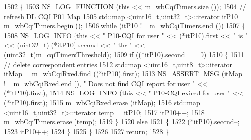 \begin{DoxyCode}
1502 \{
1503   \hyperlink{log-macros-disabled_8h_a90b90d5bad1f39cb1b64923ea94c0761}{NS\_LOG\_FUNCTION} (\textcolor{keyword}{this} << \hyperlink{classns3_1_1MmWaveFlexTtiPfMacScheduler_a3a90d6728425934c4358680b51666147}{m\_wbCqiTimers}.size ());
1504   \textcolor{comment}{// refresh DL CQI P01 Map}
1505   std::map <uint16\_t,uint32\_t>::iterator itP10 = \hyperlink{classns3_1_1MmWaveFlexTtiPfMacScheduler_a3a90d6728425934c4358680b51666147}{m\_wbCqiTimers}.begin ();
1506   \textcolor{keywordflow}{while} (itP10 != \hyperlink{classns3_1_1MmWaveFlexTtiPfMacScheduler_a3a90d6728425934c4358680b51666147}{m\_wbCqiTimers}.end ())
1507     \{
1508       \hyperlink{group__logging_gafbd73ee2cf9f26b319f49086d8e860fb}{NS\_LOG\_INFO} (\textcolor{keyword}{this} << \textcolor{stringliteral}{" P10-CQI for user "} << (*itP10).first << \textcolor{stringliteral}{" is "} << (uint32\_t)
      (*itP10).second << \textcolor{stringliteral}{" thr "} << (uint32\_t)\hyperlink{classns3_1_1MmWaveFlexTtiPfMacScheduler_ad61563379565ec249cdf6b4092fef22e}{m\_cqiTimersThreshold});
1509       \textcolor{keywordflow}{if} ((*itP10).second == 0)
1510         \{
1511           \textcolor{comment}{// delete correspondent entries}
1512           std::map <uint16\_t,uint8\_t>::iterator itMap = \hyperlink{classns3_1_1MmWaveFlexTtiPfMacScheduler_a2b746dc09bafd9ebdc2912b26c74beb9}{m\_wbCqiRxed}.find ((*itP10).first);
1513           \hyperlink{assert_8h_aff5ece9066c74e681e74999856f08539}{NS\_ASSERT\_MSG} (itMap != \hyperlink{classns3_1_1MmWaveFlexTtiPfMacScheduler_a2b746dc09bafd9ebdc2912b26c74beb9}{m\_wbCqiRxed}.end (), \textcolor{stringliteral}{" Does not find CQI report
       for user "} << (*itP10).first);
1514           \hyperlink{group__logging_gafbd73ee2cf9f26b319f49086d8e860fb}{NS\_LOG\_INFO} (\textcolor{keyword}{this} << \textcolor{stringliteral}{" P10-CQI exired for user "} << (*itP10).first);
1515           \hyperlink{classns3_1_1MmWaveFlexTtiPfMacScheduler_a2b746dc09bafd9ebdc2912b26c74beb9}{m\_wbCqiRxed}.erase (itMap);
1516           std::map <uint16\_t,uint32\_t>::iterator temp = itP10;
1517           itP10++;
1518           \hyperlink{classns3_1_1MmWaveFlexTtiPfMacScheduler_a3a90d6728425934c4358680b51666147}{m\_wbCqiTimers}.erase (temp);
1519         \}
1520       \textcolor{keywordflow}{else}
1521         \{
1522           (*itP10).second--;
1523           itP10++;
1524         \}
1525     \}
1526 
1527   \textcolor{keywordflow}{return};
1528 \}
\end{DoxyCode}


